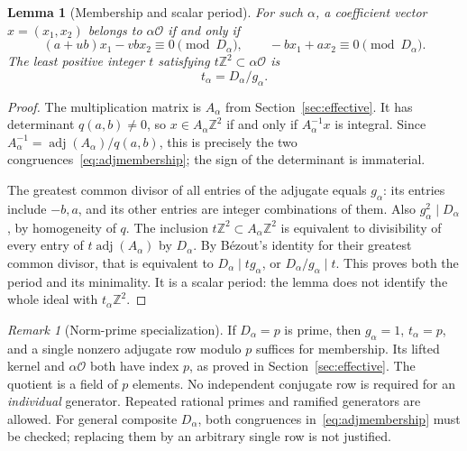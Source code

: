 \documentclass[11pt]{article}
\numberwithin{equation}{section}
\newtheorem{lemma}[theorem]{Lemma}
\theoremstyle{definition}\newtheorem{definition}[theorem]{Definition}
\theoremstyle{remark}\newtheorem{remark}[theorem]{Remark}
\newcommand{\Z}{\mathbb Z}\newcommand{\Q}{\mathbb Q}\newcommand{\R}{\mathbb R}
\newcommand{\OO}{\mathcal O}\newcommand{\PP}{\mathcal P}
\begin{document}
\begin{lemma}[Membership and scalar period]\label{lem:principalperiod}
For such $\alpha$, a coefficient vector $x=(x_1,x_2)$ belongs to $\alpha\OO$ if and only if
\begin{equation}\label{eq:adjmembership}
 (a+ub)x_1-vb x_2\equiv0\pmod{D_\alpha},
 \qquad -b x_1+a x_2\equiv0\pmod{D_\alpha}.
\end{equation}
The least positive integer $t$ satisfying $t\Z^2\subset\alpha\OO$ is
\begin{equation}\label{eq:principalperiod}
 t_\alpha=D_\alpha/g_\alpha.
\end{equation}
\end{lemma}
\begin{proof}
The multiplication matrix is $A_\alpha$ from Section~\ref{sec:effective}. It has determinant $q(a,b)\ne0$, so $x\in A_\alpha\Z^2$ if and only if $A_\alpha^{-1}x$ is integral. Since $A_\alpha^{-1}=\operatorname{adj}(A_\alpha)/q(a,b)$, this is precisely the two congruences~\eqref{eq:adjmembership}; the sign of the determinant is immaterial.

The greatest common divisor of all entries of the adjugate equals $g_\alpha$: its entries include $-b,a$, and its other entries are integer combinations of them. Also $g_\alpha^2\mid D_\alpha$, by homogeneity of $q$. The inclusion $t\Z^2\subset A_\alpha\Z^2$ is equivalent to divisibility of every entry of $t\operatorname{adj}(A_\alpha)$ by $D_\alpha$. By B\'ezout's identity for their greatest common divisor, that is equivalent to $D_\alpha\mid t g_\alpha$, or $D_\alpha/g_\alpha\mid t$. This proves both the period and its minimality. It is a scalar period: the lemma does not identify the whole ideal with $t_\alpha\Z^2$.
\end{proof}

\begin{remark}[Norm-prime specialization]\label{rem:normprime}
If $D_\alpha=p$ is prime, then $g_\alpha=1$, $t_\alpha=p$, and a single nonzero adjugate row modulo $p$ suffices for membership. Its lifted kernel and $\alpha\OO$ both have index $p$, as proved in Section~\ref{sec:effective}. The quotient is a field of $p$ elements. No independent conjugate row is required for an \emph{individual} generator. Repeated rational primes and ramified generators are allowed. For general composite $D_\alpha$, both congruences in~\eqref{eq:adjmembership} must be checked; replacing them by an arbitrary single row is not justified.
\end{remark}
\end{document}
